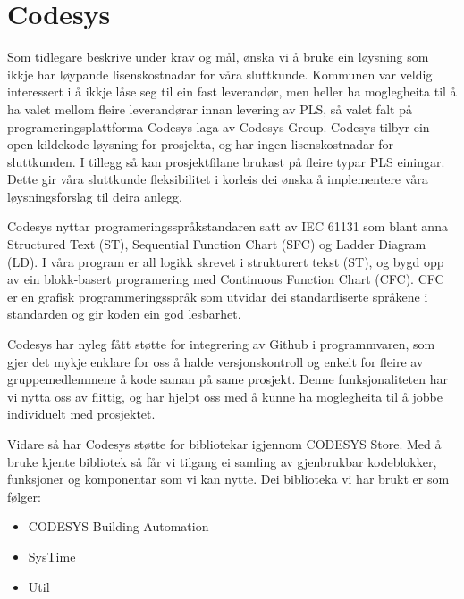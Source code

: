 \section{Codesys}
\thispagestyle{fancy}
Som tidlegare beskrive under krav og mål, ønska vi å bruke ein løysning som ikkje har løypande lisenskostnadar for våra sluttkunde. 
Kommunen var veldig interessert i å ikkje låse seg til ein fast leverandør, men heller ha moglegheita til å ha valet mellom fleire leverandørar innan levering av PLS, så valet falt på programeringsplattforma Codesys\citep{Codesys} laga av Codesys Group. 
Codesys tilbyr ein open kildekode løysning for prosjekta, og har ingen lisenskostnadar for sluttkunden. 
I tillegg så kan prosjektfilane brukast på fleire typar PLS einingar. 
Dette gir våra sluttkunde fleksibilitet i korleis dei ønska å implementere våra løysningsforslag til deira anlegg.

Codesys nyttar programeringsspråkstandaren satt av IEC 61131 som blant anna Structured Text (ST), Sequential Function Chart (SFC) og Ladder Diagram (LD). I våra program er all logikk skrevet i strukturert tekst (ST), og bygd opp av ein blokk-basert programering med Continuous Function Chart (CFC). 
CFC er en grafisk programmeringsspråk som utvidar dei standardiserte språkene i standarden og gir koden ein god lesbarhet.

Codesys har nyleg fått støtte for integrering av Github i programmvaren, som gjer det mykje enklare for oss å halde versjonskontroll og enkelt for fleire av gruppemedlemmene å kode saman på same prosjekt. 
Denne funksjonaliteten har vi nytta oss av flittig, og har hjelpt oss med å kunne ha moglegheita til å jobbe individuelt med prosjektet.

Vidare så har Codesys støtte for bibliotekar igjennom CODESYS Store. 
Med å bruke kjente bibliotek så får vi tilgang ei samling av gjenbrukbar kodeblokker, funksjoner og komponentar som vi kan nytte.
Dei biblioteka vi har brukt er som følger:

\begin{itemize}
    \item CODESYS Building Automation \citep{BuildingAutomation}
    \item SysTime \citep{DateAndTime}
    \item Util \citep{DateAndTime}
\end{itemize}

\newpage


